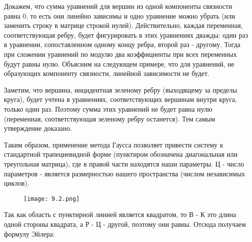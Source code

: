 \documentclass[russian]{lecture-notes}
\begin{document}
Докажем, что сумма уравнений для вершин из одной компоненты связности равна 0, то есть они линейно зависимы и одно уравнение можно убрать (или заменить строку в матрице строкой нулей). Действительно, каждая переменная, соответствующая ребру, будет фигурировать в этих уравнениях дважды: один раз в уравнении, сопоставленном одному концу ребра, второй раз - другому. Тогда при сложении уравнений по модулю два коэффициенты при всех переменных будут равны нулю. Объясним на следующем примере, что для уравнений, не образующих компоненту связности, линейной зависимости не будет.

\begin{figure}[H]
    \centering
\end{figure}

Заметим, что вершина, инцидентная зеленому ребру (выходящему за пределы круга), будет учтена в уравнениях, соответствующих вершинам внутри круга, только один раз. Поэтому сумма этих уравнений не будет равна нулю (переменная, соответствующая зеленому ребру останется). Тем самым утверждение доказано.

Таким образом, применение метода Гаусса позволяет привести систему к стандартной трапециевидной форме (пунктиром обозначена диагональная или треугольная матрица), где в правой части находятся наши параметры. Ц - число параметров - является размерностью нашего пространства (числом независимых циклов).
\begin{figure}[H]
    \centering
    \texttt{[image: 9.2.png]}
\end{figure}

Так как область с пунктирной линией является квадратом, то  В - К это длина одной стороны квадрата, а Р - Ц - другой, поэтому они равны. Отсюда получаем формулу Эйлера:
\end{document}
